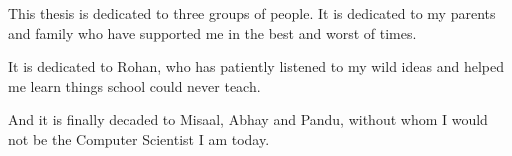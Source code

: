 \leavevmode\vfill
This thesis is dedicated to three groups of people. It is dedicated to my parents and family who have supported me in the best and worst of times. 

It is dedicated to Rohan, who has patiently listened to my wild ideas and helped me learn things school could never teach. 

And it is finally decaded to Misaal, Abhay and Pandu, without whom I would not be the Computer Scientist I am today. 
\vfill